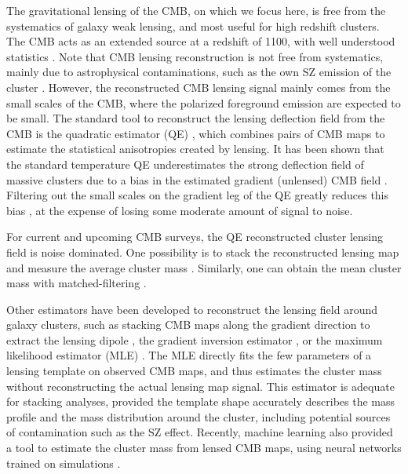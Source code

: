 \documentclass[prd, superscriptaddress, tightenlines, longbibliography, nofootinbib, eqsecnum, amsfonts, amsmath, floatfix, twocolumn, notitlepage]{revtex4-2}
\begin{document}
The gravitational lensing of the CMB, on which we focus here, is free from the systematics of galaxy weak lensing, and most useful for high redshift clusters. 
The CMB acts as an extended source at a redshift of 1100, with well understood statistics \cite{Lewis:2006fu}.
Note that CMB lensing reconstruction is not free from systematics, mainly due to astrophysical contaminations, such as the own SZ emission of the cluster \cite{Madhavacheril:2018bxi, DES:2018myw, Patil_2020}.
However, the reconstructed CMB lensing signal mainly comes from the small scales of the CMB, where the polarized foreground emission are expected to be small.
The standard tool to reconstruct the lensing deflection field from the CMB is the quadratic estimator (QE) \cite{Hu:2001tn, Hu:2001kj, Okamoto:2003zw, Planck:2018lbu}, which combines pairs of CMB maps to estimate the statistical anisotropies created by lensing.
It has been shown that the standard temperature QE underestimates the strong deflection field of massive clusters due to a bias in the estimated gradient (unlensed) CMB field \cite{Maturi:2004zj}. Filtering out the small scales on the gradient leg of the QE greatly reduces this bias \cite{Hu:2007bt}, at the expense of losing some moderate amount of signal to noise.

For current and upcoming CMB surveys, the QE reconstructed cluster lensing field is noise dominated. One possibility is to stack the reconstructed lensing map and measure the average cluster mass \cite{DES:2017fyz, Geach:2017crt, DES:2018myw, ACT:2020izl}. Similarly, one can obtain the mean cluster mass with matched-filtering \cite{Melin:2014uaa, Louis:2016gvv, Zubeldia:2019brr, Zubeldia:2020knz}.

Other estimators have been developed to reconstruct the lensing field around galaxy clusters, such as stacking CMB maps along the gradient direction to extract the lensing dipole \cite{SPT:2019qkp, Levy:2023moy}, the gradient inversion estimator \cite{Horowitz:2017iql, Hadzhiyska:2019cle}, or the maximum likelihood estimator (MLE) \cite{Lewis:2005fq,Baxter:2014frs, Raghunathan:2017cle}.
The MLE directly fits the few parameters of a lensing template on observed CMB maps, and thus estimates the cluster mass without reconstructing the actual lensing map signal. This estimator is adequate for stacking analyses, provided the template shape accurately describes the mass profile and the mass distribution around the cluster, including potential sources of contamination such as the SZ effect.
Recently, machine learning also provided a tool to estimate the cluster mass from lensed CMB maps, using neural networks trained on simulations \cite{Caldeira:2018ojb, Gupta:2020him, Parker:2022uxh}.
\end{document}
